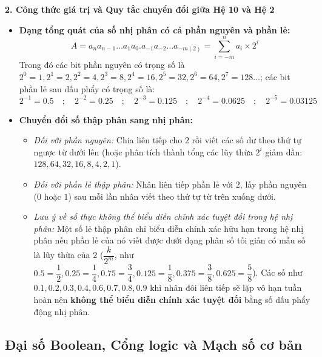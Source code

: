 \textbf{2. Công thức giá trị và Quy tắc chuyển đổi giữa Hệ 10 và Hệ 2}
\begin{itemize}
    \item \textbf{Dạng tổng quát của số nhị phân có cả phần nguyên và phần lẻ:}
    $$A = a_n a_{n-1} \dots a_1 a_0 . a_{-1} a_{-2} \dots a_{-m (2)} = \sum_{i=-m}^{n} a_i \times 2^i$$
    Trong đó các bit phần nguyên có trọng số là $2^0 = 1, 2^1 = 2, 2^2 = 4, 2^3 = 8, 2^4 = 16, 2^5 = 32, 2^6 = 64, 2^7 = 128\dots$; các bit phần lẻ sau dấu phẩy có trọng số là:
    $$2^{-1} = 0.5 \quad ; \quad 2^{-2} = 0.25 \quad ; \quad 2^{-3} = 0.125 \quad ; \quad 2^{-4} = 0.0625 \quad ; \quad 2^{-5} = 0.03125$$
    \item \textbf{Chuyển đổi số thập phân sang nhị phân:}
    \begin{itemize}
        \item \textit{Đối với phần nguyên:} Chia liên tiếp cho $2$ rồi viết các số dư theo thứ tự ngược từ dưới lên (hoặc phân tích thành tổng các lũy thừa $2^i$ giảm dần: $128, 64, 32, 16, 8, 4, 2, 1$).
        \item \textit{Đối với phần lẻ thập phân:} Nhân liên tiếp phần lẻ với $2$, lấy phần nguyên ($0$ hoặc $1$) sau mỗi lần nhân viết theo thứ tự từ trên xuống dưới.
        \item \textit{Lưu ý về số thực không thể biểu diễn chính xác tuyệt đối trong hệ nhị phân:} Một số lẻ thập phân chỉ biểu diễn chính xác hữu hạn trong hệ nhị phân nếu phần lẻ của nó viết được dưới dạng phân số tối giản có mẫu số là lũy thừa của $2$ ($\dfrac{k}{2^m}$, như $0.5 = \dfrac{1}{2}, 0.25 = \dfrac{1}{4}, 0.75 = \dfrac{3}{4}, 0.125 = \dfrac{1}{8}, 0.375 = \dfrac{3}{8}, 0.625 = \dfrac{5}{8}$). Các số như $0.1, 0.2, 0.3, 0.4, 0.6, 0.7, 0.8, 0.9$ khi nhân đôi liên tiếp sẽ lặp vô hạn tuần hoàn nên \textbf{không thể biểu diễn chính xác tuyệt đối} bằng số dấu phẩy động nhị phân.
    \end{itemize}
\end{itemize}

\subsection{Đại số Boolean, Cổng logic và Mạch số cơ bản}

